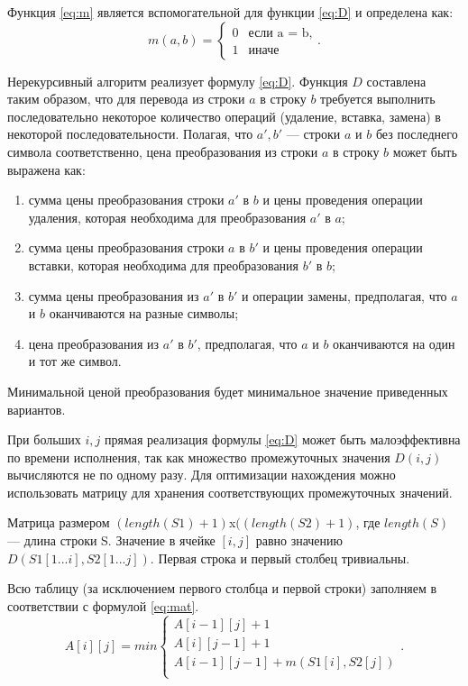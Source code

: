 Функция \ref{eq:m} является вспомогательной для функции \ref{eq:D} и определена как:
\begin{equation}
	\label{eq:m}
	m(a, b) = \begin{cases}
		0 &\text{если a = b,}\\
		1 &\text{иначе}
	\end{cases}.
\end{equation}

Нерекурсивный алгоритм реализует формулу \ref{eq:D}.
Функция $D$ составлена таким образом, что для перевода из строки $a$ в строку $b$ требуется выполнить последовательно некоторое количество операций (удаление, вставка, замена) в некоторой последовательности. Полагая, что $a', b'$  — строки $a$ и $b$ без последнего символа соответственно, цена преобразования из строки $a$ в строку $b$ может быть выражена как:
\begin{enumerate}[label={\arabic*)}]
	\item сумма цены преобразования строки $a'$ в $b$ и цены проведения операции удаления, которая необходима для преобразования $a'$ в $a$;
	\item сумма цены преобразования строки $a$ в $b'$  и цены проведения операции вставки, которая необходима для преобразования $b'$ в $b$;
	\item сумма цены преобразования из $a'$ в $b'$ и операции замены, предполагая, что $a$ и $b$ оканчиваются на разные символы;
	\item цена преобразования из $a'$ в $b'$, предполагая, что $a$ и $b$ оканчиваются на один и тот же символ.
\end{enumerate}
Минимальной ценой преобразования будет минимальное значение приведенных вариантов.

При больших $i, j$ прямая реализация формулы \ref{eq:D} может быть малоэффективна по времени исполнения, так как множество промежуточных значения $ D(i, j)$ вычисляются не по одному разу. Для оптимизации нахождения можно использовать матрицу для хранения соответствующих промежуточных значений.

Матрица размером $(length(S1)+ 1)$x$((length(S2) + 1)$, где $length(S)$ — длина строки S. Значение в ячейке $[i, j]$ равно значению $D(S1[1...i], S2[1...j])$. Первая строка и первый столбец тривиальны. 

Всю таблицу (за исключением первого столбца и первой строки) заполняем в соответствии с формулой \ref{eq:mat}.
\begin{equation}
	\label{eq:mat}
	A[i][j] = min \begin{cases}
		A[i-1][j] + 1\\
		 A[i][j-1] + 1\\
		 A[i-1][j-1] + m(S1[i], S2[j])\\
	 \end{cases}.
 \end{equation}

